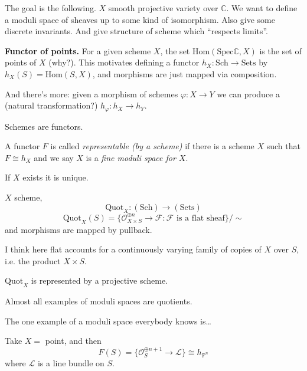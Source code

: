 The goal is the following. $X$ smooth projective variety over $\mathbb{C}$. We
want to define a moduli space of sheaves up to some kind of isomorphism. Also
give some discrete invariants. And give structure of scheme which ``respects
limits''.

{\bf Functor of points.} For a given scheme $X$, the set
$\text{Hom}(\text{Spec}\mathbb{C},X)$ is the set of points of $X$ (why?). This motivates
defining a functor $h_X:\text{Sch}\to \text{Sets}$ by $h_X(S)=\text{Hom}(S,X)$,
and morphisms are just mapped via composition.

And there's more: given a morphism of schemes $\varphi:X\to Y$ we can produce a
(natural transformation?) $h_\varphi:h_X \to h_Y$.

\begin{slogan}
Schemes are functors.
\end{slogan}

\begin{definition}
\label{definition-representable-functor-by-scheme}
A functor $F$ is called {\it representable (by a scheme)} if there is a scheme
$X$ such that $F\cong h_X$ and we say $X$ is a {\it fine moduli space for $X$}.
\end{definition}

\begin{remark}
\label{remark-uniqueness-of-representable-functor}
If $X$ exists it is unique.
\end{remark}

\begin{example}
\label{example-quotient-sheaf}
$X$ scheme,
$$
\text{Quot}_X:(\text{Sch})\to (\text{Sets})
$$
$$
\text{Quot}_X(S)=\{
\mathcal{O}_{X \times S}^{\oplus n}\to\mathcal{F}
:\mathcal{F} \text{ is a flat sheaf}\}\Big/ \sim
$$
and morphisms are mapped by pullback.
\end{example}

I think here flat accounts for a continuously varying family of copies of $X$
over $S$, i.e. the product $X \times S$.

\begin{theorem}
\label{theorem-Quot-is-represented}
$\text{Quot}_X$ is represented by a projective scheme.
\end{theorem}

Almost all examples of moduli spaces are quotients.

\medskip\noindent

The one example of a moduli space everybody knows is…

\begin{example}
\label{example-projective-space-is-a-quotient}
Take $X=$ point, and then
$$
F(S)=\{\mathcal{O}_S^{\oplus n+1}\to \mathcal{L}\}\cong h_{\mathbb{P}^n}
$$
where $\mathcal{L}$ is a line bundle on $S$.
\end{example}


